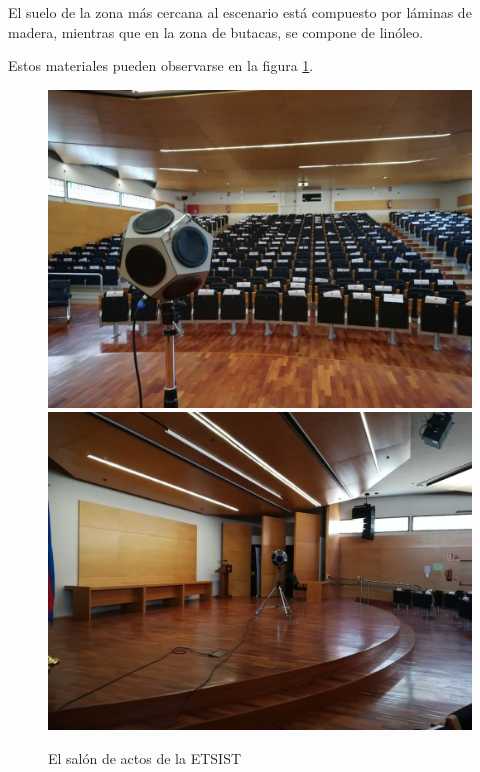 \documentclass[11pt,a4paper,twoside]{book}
\begin{document}
 			El suelo de la zona más cercana al escenario está compuesto por láminas de madera, mientras que en la zona de butacas, se compone de linóleo.
 
 			Estos materiales pueden observarse en la figura \ref{fig:materiales}.
 
 			\begin{figure}
 				\includegraphics[scale=.25]{../imagenes/fuente.jpg}%
 				\includegraphics[scale=.25]{../imagenes/fuente2.jpg} 
 				\centering
 				\caption{El salón de actos de la ETSIST}
 				\label{fig:materiales}

 			\end{figure}
 
\end{document}
